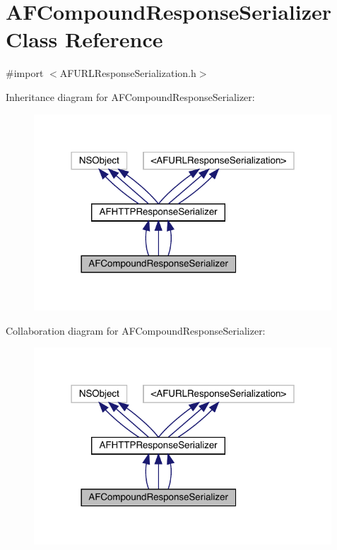 \hypertarget{interface_a_f_compound_response_serializer}{}\section{A\+F\+Compound\+Response\+Serializer Class Reference}
\label{interface_a_f_compound_response_serializer}


{\ttfamily \#import $<$A\+F\+U\+R\+L\+Response\+Serialization.\+h$>$}



Inheritance diagram for A\+F\+Compound\+Response\+Serializer\+:\nopagebreak
\begin{figure}[H]
\begin{center}
\leavevmode
\includegraphics[width=316pt]{interface_a_f_compound_response_serializer__inherit__graph}
\end{center}
\end{figure}


Collaboration diagram for A\+F\+Compound\+Response\+Serializer\+:\nopagebreak
\begin{figure}[H]
\begin{center}
\leavevmode
\includegraphics[width=316pt]{interface_a_f_compound_response_serializer__coll__graph}
\end{center}
\end{figure}
